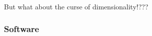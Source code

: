 \documentclass[
    xcolor={svgnames,dvipsnames},
    hyperref={colorlinks, citecolor=DeepPink4, linkcolor=DarkRed, urlcolor=DarkBlue}
    ]{beamer}  %
\newcommand{\1}{\mathbbm 1}
\begin{document}
\begin{frame}
    
    But what about the curse of dimensionality!???

\end{frame}

\begin{frame}
    \frametitle{Software}
    
    \begin{figure}
       \begin{center}
       \end{center}
    \end{figure}


\end{frame}
\end{document}
